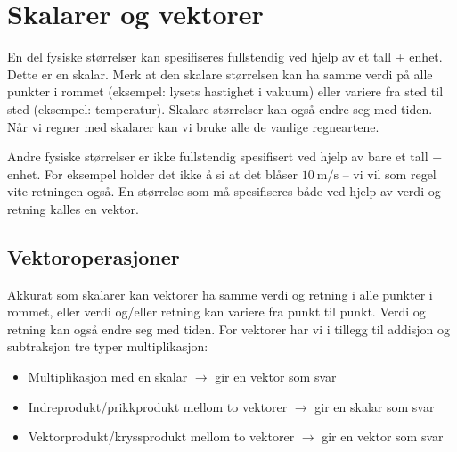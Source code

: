 \documentclass[a4paper,norsk,12pt]{book}
\begin{document}
\chapter{Skalarer og vektorer}
En del fysiske størrelser kan spesifiseres fullstendig ved hjelp av et tall + enhet. Dette er en skalar. Merk at den skalare størrelsen kan ha samme verdi på alle punkter i rommet (eksempel: lysets hastighet i vakuum) eller variere fra sted til sted (eksempel: temperatur). Skalare størrelser kan også endre seg med tiden. Når vi regner med skalarer kan vi bruke alle de vanlige regneartene.

Andre fysiske størrelser er ikke fullstendig spesifisert ved hjelp av bare et tall + enhet. For eksempel holder det ikke å si at det blåser $10~\mathrm{m/s}$ -- vi vil som regel vite retningen også. En størrelse som må spesifiseres både ved hjelp av verdi og retning kalles en vektor. 


\section{Vektoroperasjoner}
Akkurat som skalarer kan vektorer ha samme verdi og retning i alle punkter i rommet, eller verdi og/eller retning kan variere fra punkt til punkt. Verdi og retning kan også endre seg med tiden. For vektorer har vi i tillegg til addisjon og subtraksjon tre typer multiplikasjon:
\begin{itemize}
\item Multiplikasjon med en skalar $\to$ gir en vektor som svar
\item Indreprodukt/prikkprodukt mellom to vektorer $\to$ gir en skalar som svar
\item Vektorprodukt/kryssprodukt mellom to vektorer $\to$ gir en vektor som svar
\end{itemize}
\end{document}
